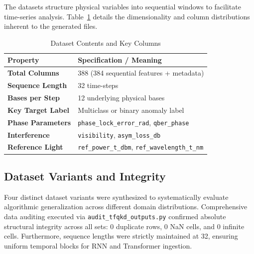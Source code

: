\documentclass[conference]{IEEEtran}
\begin{document}
The datasets structure physical variables into sequential windows to facilitate time-series analysis. Table~\ref{tab:dataset_contents} details the dimensionality and column distributions inherent to the generated files.

\begin{table}[h]
\caption{Dataset Contents and Key Columns}
\label{tab:dataset_contents}
\centering
\begin{tabular}{@{}ll@{}}
\toprule
\textbf{Property} & \textbf{Specification / Meaning} \\
\midrule
\textbf{Total Columns} & 388 (384 sequential features + metadata) \\
\textbf{Sequence Length} & 32 time-steps \\
\textbf{Bases per Step} & 12 underlying physical bases \\
\textbf{Key Target Label} & Multiclass or binary anomaly label \\
\textbf{Phase Parameters} & \texttt{phase\_lock\_error\_rad}, \texttt{qber\_phase} \\
\textbf{Interference} & \texttt{visibility}, \texttt{asym\_loss\_db} \\
\textbf{Reference Light} & \texttt{ref\_power\_t\_dbm}, \texttt{ref\_wavelength\_t\_nm} \\
\bottomrule
\end{tabular}
\end{table}

\subsection{Dataset Variants and Integrity}
Four distinct dataset variants were synthesized to systematically evaluate algorithmic generalization across different domain distributions. Comprehensive data auditing executed via \texttt{audit\_tfqkd\_outputs.py} confirmed absolute structural integrity across all sets: 0 duplicate rows, 0 NaN cells, and 0 infinite cells. Furthermore, sequence lengths were strictly maintained at 32, ensuring uniform temporal blocks for RNN and Transformer ingestion.
\end{document}
